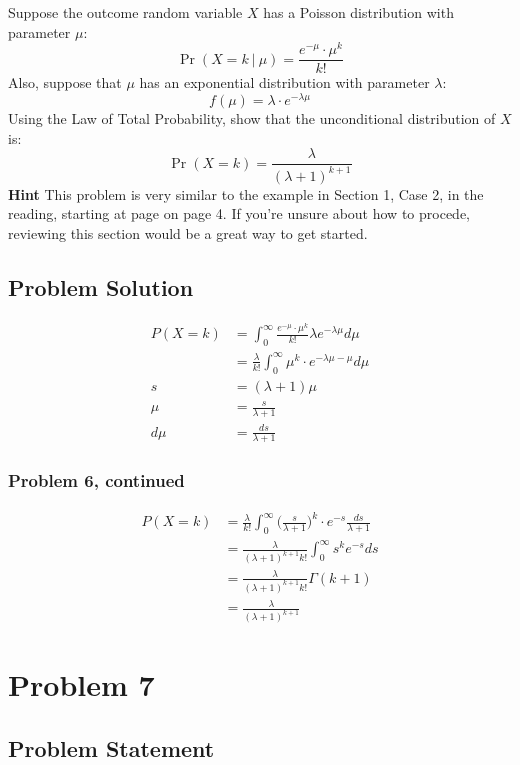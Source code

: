 \documentclass[12pt]{article}
\theoremstyle{definition}
\begin{document}
Suppose the outcome random variable $X$ has a Poisson distribution with parameter $\mu$:
$$
\Pr(X = k\ |\ \mu) = \frac{ e^{-\mu} \cdot \mu^k}{k!}
$$
Also, suppose that $\mu$ has an exponential distribution with parameter $\lambda$:
$$
f(\mu) = \lambda \cdot e^{-\lambda \mu}
$$
Using the Law of Total Probability, show that the unconditional distribution of $X$ is:
$$
\Pr( X = k ) = \frac{ \lambda }{(\lambda + 1)^{k+1}}
$$
{\bf Hint} This problem is very similar to the example in Section 1, Case 2, in the reading, starting at page on page 4. If you're unsure about how to procede, reviewing this section would be a great way to get started.


\subsection*{Problem Solution}
\begin{align*}
P(X=k) &= \int_0^\infty \frac{e^{-\mu} \cdot \mu^k}{k!} \lambda e^{-\lambda \mu} d\mu\\
&= \frac{\lambda}{k!} \int_0^\infty \mu^k \cdot e^{-\lambda \mu - \mu}d\mu\\
s &= (\lambda + 1) \mu\\
\mu &= \frac{s}{\lambda + 1}\\
d\mu &= \frac{ds}{\lambda + 1}
\end{align*}


\newpage
\subsubsection*{Problem 6, continued}
\begin{align*}
P(X=k) &= \frac{\lambda}{k!} \int_0^\infty \biggr(\frac{s}{\lambda + 1}\biggr)^k \cdot e^{-s}\frac{ds}{\lambda + 1}\\
&= \frac{\lambda}{(\lambda + 1)^{k + 1} k!} \int_0^\infty s^k e^{-s}ds\\
&= \frac{\lambda}{(\lambda + 1)^{k + 1} k!} \Gamma(k + 1)\\
&= \frac{\lambda}{(\lambda + 1)^{k + 1}}
\end{align*}


\newpage
\section*{Problem 7}

\subsection*{Problem Statement}
\end{document}
